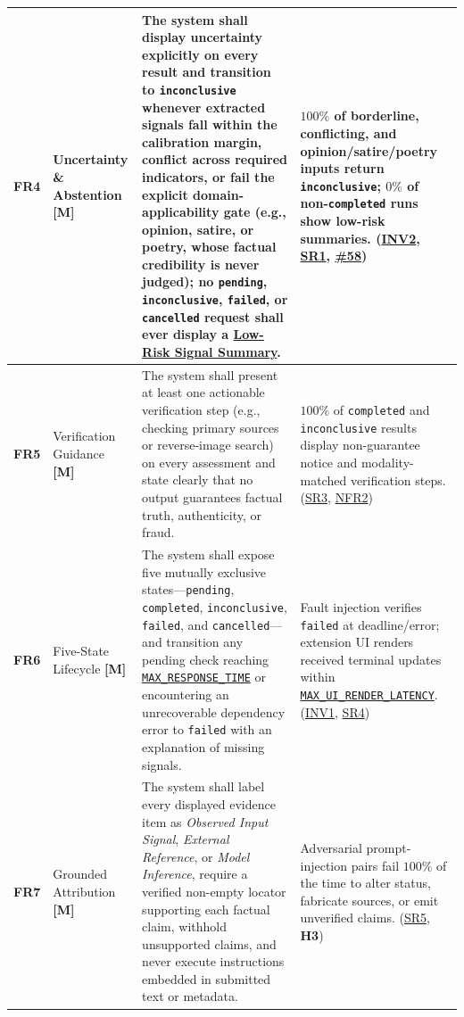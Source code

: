 \documentclass[11pt]{article}
\newcommand{\MaxResponseTime}{\hyperref[const:MAX_RESPONSE_TIME]{\texttt{MAX\_\allowbreak{}RESPONSE\_\allowbreak{}TIME}}}
\newcommand{\MaxUiRenderLatency}{\hyperref[const:MAX_UI_RENDER_LATENCY]{\texttt{MAX\_\allowbreak{}UI\_\allowbreak{}RENDER\_\allowbreak{}LATENCY}}}
\newcommand{\TermLowRisk}{\hyperlink{gls-lowrisk}{Low-Risk Signal Summary}}
\begin{document}
{\begin{tabularx}{\textwidth}{P{1.1cm} P{2.25cm} Y Q{3.85cm}}
\label{FR4}\textbf{FR4} & Uncertainty \& Abstention \textbf{[M]} &
The system shall display uncertainty explicitly on every result and transition to \texttt{inconclusive} whenever extracted signals fall within the calibration margin, conflict across required indicators, or fail the explicit domain-applicability gate (e.g., opinion, satire, or poetry, whose factual credibility is never judged); no \texttt{pending}, \texttt{inconclusive}, \texttt{failed}, or \texttt{cancelled} request shall ever display a \TermLowRisk{}. &
$100\%$ of borderline, conflicting, and opinion/satire/poetry inputs return \texttt{inconclusive}; $0\%$ of non-\texttt{completed} runs show low-risk summaries. (\hyperref[INV2]{INV2}, \hyperref[SR1]{SR1}, \href{https://github.com/richy1337/Verity/issues/58}{\#58})\\
\midrule

\label{FR5}\textbf{FR5} & Verification Guidance \textbf{[M]} &
The system shall present at least one actionable verification step (e.g., checking primary sources or reverse-image search) on every assessment and state clearly that no output guarantees factual truth, authenticity, or fraud. &
$100\%$ of \texttt{completed} and \texttt{inconclusive} results display non-guarantee notice and modality-matched verification steps. (\hyperref[SR3]{SR3}, \hyperref[NFR2]{NFR2})\\
\midrule

\label{FR6}\textbf{FR6} & Five-State Lifecycle \textbf{[M]} &
The system shall expose five mutually exclusive states---\texttt{pending}, \texttt{completed}, \texttt{inconclusive}, \texttt{failed}, and \texttt{cancelled}---and transition any pending check reaching \MaxResponseTime{} or encountering an unrecoverable dependency error to \texttt{failed} with an explanation of missing signals. &
Fault injection verifies \texttt{failed} at deadline/error; extension UI renders received terminal updates within \MaxUiRenderLatency{}. (\hyperref[INV1]{INV1}, \hyperref[SR4]{SR4})\\
\midrule

\label{FR7}\textbf{FR7} & Grounded Attribution \textbf{[M]} &
The system shall label every displayed evidence item as \emph{Observed Input Signal}, \emph{External Reference}, or \emph{Model Inference}, require a verified non-empty locator supporting each factual claim, withhold unsupported claims, and never execute instructions embedded in submitted text or metadata. &
Adversarial prompt-injection pairs fail $100\%$ of the time to alter status, fabricate sources, or emit unverified claims. (\hyperref[SR5]{SR5}, \textbf{H3})\\
\midrule


\end{tabularx}}
\end{document}
